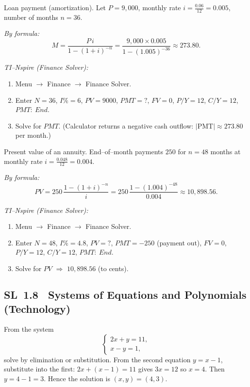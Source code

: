 \documentclass[11pt]{article}
\def\textbf#1{#1}%
\def\mathbf#1{#1}%
\newcommand{\tocsubsection}[1]{\subsection{#1}}
\begin{document}
\begin{solution}
\textbf{Loan payment (amortization).} Let \(P=9{,}000\), monthly rate \(i=\tfrac{0.06}{12}=0.005\), number of months \(n=36\).

\emph{By formula:}
\[
M=\frac{P\,i}{1-(1+i)^{-n}}
=\frac{9{,}000\times 0.005}{1-(1.005)^{-36}}
\approx \boxed{273.80}.
\]

\emph{TI–Nspire (Finance Solver):}
\begin{enumerate}[itemsep=1pt]
  \item \textbf{Menu} \(\to\) \textbf{Finance} \(\to\) \textbf{Finance Solver}.
  \item Enter \(\mathbf{N}=36\), \(\mathbf{I\%}=6\), \(\mathbf{PV}=9000\), \(\mathbf{PMT}=?\),
        \(\mathbf{FV}=0\), \(\mathbf{P/Y}=12\), \(\mathbf{C/Y}=12\), \(\mathbf{PMT:\ End}\).
  \item Solve for \(\textbf{PMT}\). (Calculator returns a negative cash outflow:
        \(|\text{PMT}|\approx \boxed{273.80}\) per month.)
\end{enumerate}
\end{solution}

\begin{solution}
\textbf{Present value of an annuity.} End–of–month payments \(250\) for \(n=48\) months at monthly rate
\(i=\tfrac{0.048}{12}=0.004\).

\emph{By formula:}
\[
PV=250\,\frac{1-(1+i)^{-n}}{i}
=250\,\frac{1-(1.004)^{-48}}{0.004}
\approx \boxed{10{,}898.56}.
\]

\emph{TI–Nspire (Finance Solver):}
\begin{enumerate}[itemsep=1pt]
  \item \textbf{Menu} \(\to\) \textbf{Finance} \(\to\) \textbf{Finance Solver}.
  \item Enter \(\mathbf{N}=48\), \(\mathbf{I\%}=4.8\), \(\mathbf{PV}=?\),
        \(\mathbf{PMT}=-250\) (payment out), \(\mathbf{FV}=0\),
        \(\mathbf{P/Y}=12\), \(\mathbf{C/Y}=12\), \(\mathbf{PMT:\ End}\).
  \item Solve for \(\textbf{PV}\) \(\Rightarrow\) \(\boxed{10{,}898.56}\) (to cents).
\end{enumerate}
\end{solution}



\tocsubsection{SL 1.8 \; Systems of Equations and Polynomials (Technology)}

\begin{solution}
From the system 
\[
\begin{cases}
2x + y = 11,\\
x - y = 1,
\end{cases}
\]
solve by elimination or substitution. From the second equation $y = x - 1$, substitute into the first: $2x + (x - 1) = 11$ gives $3x=12$ so $x=4$. Then $y = 4 - 1 = 3$. Hence the solution is $(x,y)=(4,3)$.
\end{solution}
\end{document}
